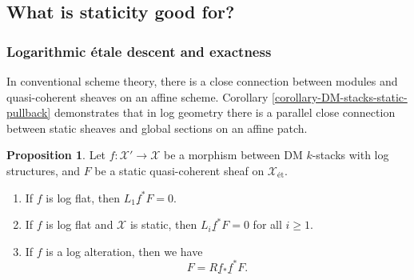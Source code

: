 \documentclass[11pt]{amsart}
\theoremstyle{definition}
\theoremstyle{definition}
\newtheorem{proposition}[theorem]{Proposition}
\newcommand{\ul}[1]{\underline{#1}}
\begin{document}
\subsection{What is staticity good for?}
\subsubsection{Logarithmic \'etale descent and exactness} In conventional scheme theory, there is a close connection between modules and quasi-coherent sheaves on an affine scheme. Corollary \ref{corollary-DM-stacks-static-pullback} demonstrates that in log geometry there is a parallel close connection between static sheaves and global sections on an affine patch.
\begin{proposition}\label{proposition-on-derived-pullback-vanishing-static}
Let $f\colon \mathcal{X}'\rightarrow \mathcal{X}$ be a morphism between DM $k$-stacks with log structures, and $F$ be a static quasi-coherent sheaf on $\mathcal{X}_{\text{\'et}}$.
\begin{enumerate}
    \item\label{item: static first derived pull vanishes} If $f$ is log flat, then $L_{1}\ul{f}^{*}F=0$.
    \item\label{item: static all derived pulls vanish} If $f$ is log flat and $\mathcal{X}$ is static, then $L_{i}\ul{f}^{*} F=0$ for all $i\geq 1$.
    \item\label{item: static push pull is identity} If $f$ is a log alteration, then we have
\[F=R\ul{f}{}_{*}\ul{f}^{*}F.\]
\end{enumerate}
\end{proposition}
\end{document}
